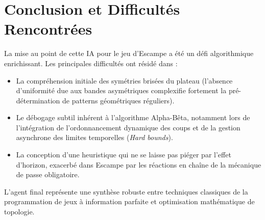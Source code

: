 \documentclass[12pt,a4paper]{article}
\begin{document}
\section{Conclusion et Difficultés Rencontrées}
La mise au point de cette IA pour le jeu d'Escampe a été un défi algorithmique enrichissant. Les principales difficultés ont résidé dans :
\begin{itemize}
    \item La compréhension initiale des symétries brisées du plateau (l'absence d'uniformité due aux bandes asymétriques complexifie fortement la pré-détermination de patterns géométriques réguliers).
    \item Le débogage subtil inhérent à l'algorithme Alpha-Bêta, notamment lors de l'intégration de l'ordonnancement dynamique des coups et de la gestion asynchrone des limites temporelles (\textit{Hard bounds}).
    \item La conception d'une heuristique qui ne se laisse pas piéger par l'effet d'horizon, exacerbé dans Escampe par les réactions en chaîne de la mécanique de passe obligatoire.
\end{itemize}
L'agent final représente une synthèse robuste entre techniques classiques de la programmation de jeux à information parfaite et optimisation mathématique de topologie.
\end{document}

